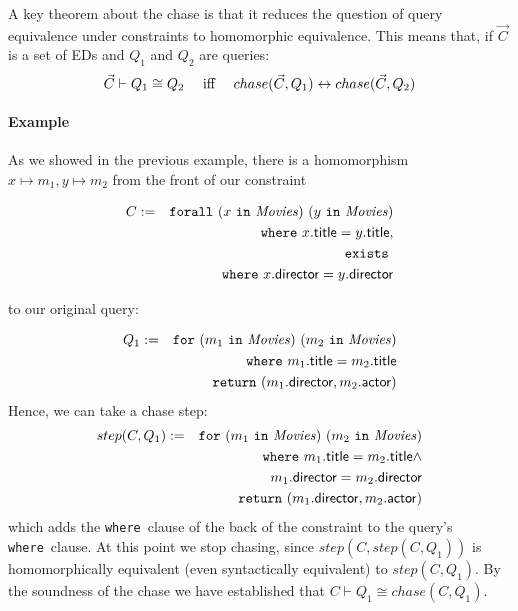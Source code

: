 \documentclass{sigplanconf}
\newcommand{\FOR}{{\tt for}\relax\ifmmode\ \else\xspace\fi}
\newcommand{\FORALL}{{\tt forall}\relax\ifmmode\ \else\xspace\fi}
\newcommand{\EXISTS}{{\tt exists}\relax\ifmmode\ \else\xspace\fi}
\newcommand{\WHERE}{{\tt where}\relax\ifmmode\ \else\xspace\fi}
\newcommand{\IN}{ \ {\tt in} \ }
\newcommand{\RETURN}{{\tt return}\relax\ifmmode\ \else\xspace\fi}
\newcommand{\relation}[1]{\ensuremath{\mathit{#1}}\xspace}
\begin{document}
A key theorem about the chase is that it reduces the question of query equivalence under constraints to homomorphic equivalence.
This means that, if $\vec{C}$ is a set of EDs and $Q_1$ and $Q_2$ are queries:
\[
\vec{C} \vdash Q_1 \cong Q_2 \ \ \ \  \textnormal{iff} \ \ \ \ chase(\vec{C},Q_1) \leftrightarrow chase(\vec{C}, Q_2)
\]
\paragraph{Example}
As we showed in the previous example, there is a homomorphism $x \mapsto m_1, y \mapsto m_2$ from the front of our constraint
\begin{normalsize}
\begin{eqnarray*}
C& := & \FORALL (x \IN \relation{Movies}) \ (y \IN \relation{Movies}) \\
& & \WHERE x.{\sf title} = y.{\sf title}, \\ 
& & \EXISTS \\
& & \WHERE x.{\sf director} = y.{\sf director}
\end{eqnarray*}
\end{normalsize}
to our original query:

\begin{eqnarray*}
Q_1 & := & \FOR (m_1 \IN \relation{Movies}) \ (m_2 \IN \relation{Movies}) \\
 & & \WHERE m_1.{\sf title} = m_2.{\sf title} \\
 & & \RETURN (m_1.{\sf director}, m_2.{\sf actor})
\end{eqnarray*}
Hence, we can take a chase step:
\begin{eqnarray*}
step(C, Q_1) & := & \FOR (m_1 \IN \relation{Movies}) \ (m_2 \IN \relation{Movies}) \\
 & & \WHERE m_1.{\sf title} = m_2.{\sf title} \wedge \\
 & & \ \ \ \ \ \ \ \ \ \ \ \  m_1.{\sf director} = m_2.{\sf 
director} \\
 & & \RETURN (m_1.{\sf director}, m_2.{\sf actor})
\end{eqnarray*}
which adds the \WHERE clause of the back of the constraint to the query's \WHERE clause.
At this point we stop chasing, since $step(C, step(C, Q_1))$ is homomorphically equivalent (even syntactically equivalent) to $step(C, Q_1)$.
By the soundness of the chase we have established that $C \vdash Q_1 \cong chase(C, Q_1)$.
\end{document}
